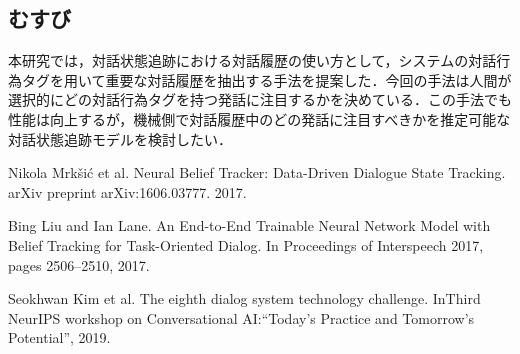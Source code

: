 \documentclass[a4j,twoside]{jarticle}
\begin{document}
\begin{論文概要}
\section{むすび}
本研究では，対話状態追跡における対話履歴の使い方として，システムの対話行為タグを用いて重要な対話履歴を抽出する手法を提案した．今回の手法は人間が選択的にどの対話行為タグを持つ発話に注目するかを決めている．この手法でも性能は向上するが，機械側で対話履歴中のどの発話に注目すべきかを推定可能な対話状態追跡モデルを検討したい．
\footnotesize

\vspace{-1mm}
\begin{thebibliography}{99}
Nikola Mrk{\v{s}}i{\'c} et al. Neural Belief Tracker: Data-Driven Dialogue State Tracking. arXiv preprint arXiv:1606.03777. 2017.

Bing Liu and Ian Lane. An End-to-End Trainable Neural Network Model with Belief Tracking for Task-Oriented Dialog. In Proceedings of Interspeech 2017, pages 2506--2510, 2017.

Seokhwan Kim et al. The eighth dialog system technology challenge. InThird NeurIPS workshop on Conversational AI:“Today’s Practice and Tomorrow’s Potential”, 2019.
\end{thebibliography}

\clearpage                       %
\end{論文概要}                   %
\end{document}
